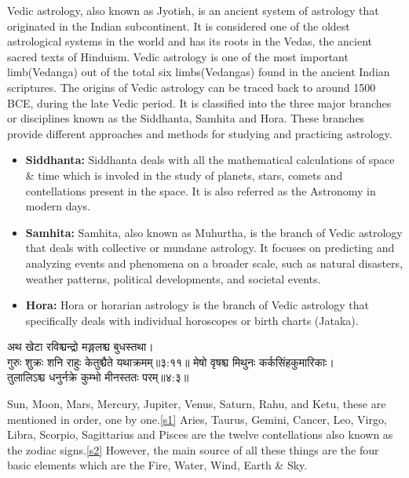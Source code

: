Vedic astrology, also known as Jyotish, is an ancient system of astrology that originated in the Indian subcontinent. It is considered one of the oldest astrological systems in the world and has its roots in the Vedas, the ancient sacred texts of Hinduism.
Vedic astrology is one of the most important limb(Vedanga) out of the total six limbs(Vedangas) found in the ancient Indian scriptures. The origins of Vedic astrology can be traced back to around 1500 BCE, during the late Vedic period. It is classified into the three major branches or disciplines known as the Siddhanta, Samhita and Hora. These branches provide different approaches and methods for studying and practicing astrology.
\begin{itemize}
	\item \textbf{Siddhanta:} Siddhanta deals with all the mathematical calculations of space \& time which is involed in the study of planets, stars, comets and contellations present in the space. It is also referred as the Astronomy in modern days.
	\item \textbf{Samhita:} Samhita, also known as Muhurtha, is the branch of Vedic astrology that deals with collective or mundane astrology. It focuses on predicting and analyzing events and phenomena on a broader scale, such as natural disasters, weather patterns, political developments, and societal events.
	\item \textbf{Hora:} Hora or horarian astrology is the branch of Vedic astrology that specifically deals with individual horoscopes or birth charts (Jataka).
\end{itemize}

\begin{sanskrit}
	\begin{center}
		अथ खेटा रविश्चन्द्रो मङ्गलश्च बुधस्तथा।\\गुरुः शुक्रः शनि राहुः केतुश्चैते यथाक्रमम्‌॥३:११॥\cite{BrihatParasharHoraShastraVol1}\cite{wiki:bphs}\label{s1}
		मेषो वृषश्च मिथुनः कर्कसिंहकुमारिकाः।\\तुलालिऽश्च धनुर्नक्रे कुम्भो मीनस्ततः परम्‌॥४:३॥\cite{BrihatParasharHoraShastraVol1}\cite{wiki:bphs}\label{s2}
	\end{center}
\end{sanskrit}
Sun, Moon, Mars, Mercury, Jupiter, Venus, Saturn, Rahu, and Ketu, these are mentioned in order, one by one.\ref{s1}
Aries, Taurus, Gemini, Cancer, Leo, Virgo, Libra, Scorpio, Sagittarius and Pisces are the twelve contellations also known as the zodiac signs.\ref{s2}
However, the main source of all these things are the four basic elements which are the Fire, Water, Wind, Earth \& Sky.

